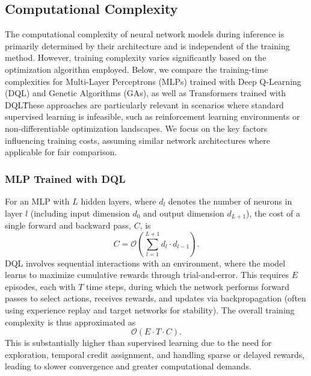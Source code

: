 \documentclass[preprint,3p,authoryear]{elsarticle}
\begin{document}
\subsection{Computational Complexity}

The computational complexity of neural network models during inference is primarily determined by their architecture and is independent of the training method. However, training complexity varies significantly based on the optimization algorithm employed. Below, we compare the training-time complexities for Multi-Layer Perceptrons (MLPs) trained with Deep Q-Learning (DQL) and Genetic Algorithms (GAs), as well as Transformers trained with DQL\. These approaches are particularly relevant in scenarios where standard supervised learning is infeasible, such as reinforcement learning environments or non-differentiable optimization landscapes. We focus on the key factors influencing training costs, assuming similar network architectures where applicable for fair comparison.

\subsubsection{MLP Trained with DQL}
For an MLP with $L$ hidden layers, where $d_l$ denotes the number of neurons in layer $l$ (including input dimension $d_0$ and output dimension $d_{L+1}$), the cost of a single forward and backward pass, $C$, is
\[
C = \mathcal{O}\!\left( \sum_{l=1}^{L+1} d_l \cdot d_{l-1} \right).
\]
DQL involves sequential interactions with an environment, where the model learns to maximize cumulative rewards through trial-and-error. This requires $E$ episodes, each with $T$ time steps, during which the network performs forward passes to select actions, receives rewards, and updates via backpropagation (often using experience replay and target networks for stability). The overall training complexity is thus approximated as
\[
\mathcal{O}(E \cdot T \cdot C).
\]
This is substantially higher than supervised learning due to the need for exploration, temporal credit assignment, and handling sparse or delayed rewards, leading to slower convergence and greater computational demands.
\end{document}

